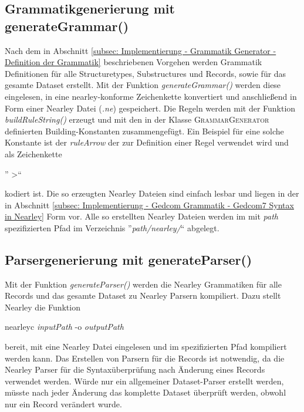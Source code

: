\subsection{Grammatikgenerierung mit generateGrammar()}
\label{subsec: Implementierung - Grammatik Generator - generateGrammar}
Nach dem in Abschnitt \ref{subsec: Implementierung - Grammatik Generator - Definition der Grammatik} beschriebenen Vorgehen werden Grammatik Definitionen für alle Structuretypes, Substructures und Records, sowie für das gesamte Dataset erstellt. Mit der Funktion \textit{generateGrammar()} werden diese eingelesen, in eine nearley-konforme Zeichenkette konvertiert und anschließend in Form einer Nearley Datei (\textit{.ne}) gespeichert. Die Regeln werden mit der Funktion \textit{buildRuleString()} erzeugt und mit den in der Klasse \textsc{GrammarGenerator} definierten Building-Konstanten zusammengefügt. Ein Beispiel für eine solche Konstante ist der \textit{ruleArrow} der zur Definition einer Regel verwendet wird und als Zeichenkette 
\begin{center}
	'' \textendash\textgreater``
\end{center}
kodiert ist. Die so erzeugten Nearley Dateien sind einfach lesbar und liegen in der in Abschnitt \ref{subsec: Implementierung - Gedcom Grammatik - Gedcom7 Syntax in Nearley} Form vor. Alle so erstellten Nearley Dateien werden im mit \textit{path} spezifizierten Pfad im Verzeichnis ''\textit{path/nearley/}`` abgelegt.

\subsection{Parsergenerierung mit generateParser()}
\label{subsec: Implementierung - Grammatik Generator - generateParser}
Mit der Funktion \textit{generateParser()} werden die Nearley Grammatiken für alle Records und das gesamte Dataset zu Nearley Parsern kompiliert. Dazu stellt Nearley die Funktion 
\begin{center}
	nearleyc  \textit{inputPath} -o \textit{outputPath}
\end{center}
bereit, mit eine Nearley Datei eingelesen und im spezifizierten Pfad kompiliert werden kann. Das Erstellen von Parsern für die Records ist notwendig, da die Nearley Parser für die Syntaxüberprüfung nach Änderung eines Records verwendet werden. Würde nur ein allgemeiner Dataset-Parser erstellt werden, müsste nach jeder Änderung das komplette Dataset überprüft werden, obwohl nur ein Record verändert wurde. 

